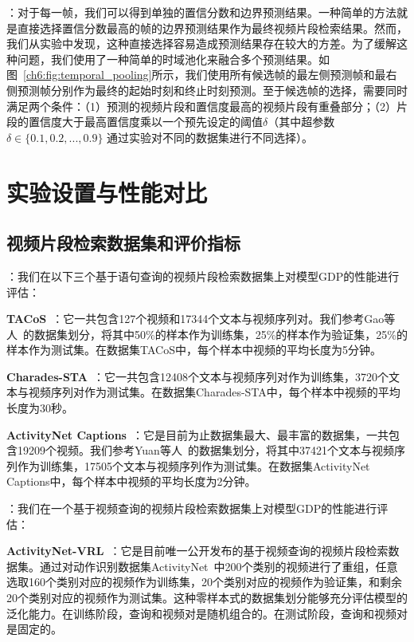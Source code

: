 \textbf{}：对于每一帧，我们可以得到单独的置信分数和边界预测结果。一种简单的方法就是直接选择置信分数最高的帧的边界预测结果作为最终视频片段检索结果。然而，我们从实验中发现，这种直接选择容易造成预测结果存在较大的方差。为了缓解这种问题，我们使用了一种简单的时域池化来融合多个预测结果。如图~\ref{ch6:fig:temporal_pooling}所示，我们使用所有候选帧的最左侧预测帧和最右侧预测帧分别作为最终的起始时刻和终止时刻预测。至于候选帧的选择，需要同时满足两个条件：（1）预测的视频片段和置信度最高的视频片段有重叠部分；（2）片段的置信度大于最高置信度乘以一个预先设定的阈值$\delta$（其中超参数$\delta \in \{0.1, 0.2, ..., 0.9 \}$ 通过实验对不同的数据集进行不同选择）。


\section{实验设置与性能对比}

\subsection{视频片段检索数据集和评价指标}

\textbf{}：我们在以下三个基于语句查询的视频片段检索数据集上对模型GDP的性能进行评估：

\textbf{TACoS}~\cite{regneri2013grounding}：它一共包含127个视频和17344个文本与视频序列对。我们参考Gao等人~\cite{gao2017tall}的数据集划分，将其中50\%的样本作为训练集，25\%的样本作为验证集，25\%的样本作为测试集。在数据集TACoS中，每个样本中视频的平均长度为5分钟。

\textbf{Charades-STA}~\cite{gao2017tall}：它一共包含12408个文本与视频序列对作为训练集，3720个文本与视频序列对作为测试集。在数据集Charades-STA中，每个样本中视频的平均长度为30秒。

\textbf{ActivityNet Captions}~\cite{krishna2017dense}：它是目前为止数据集最大、最丰富的数据集，一共包含19209个视频。我们参考Yuan等人~\cite{yuan2019find}的数据集划分，将其中37421个文本与视频序列作为训练集，17505个文本与视频序列作为测试集。在数据集ActivityNet Captions中，每个样本中视频的平均长度为2分钟。


\textbf{}：我们在一个基于视频查询的视频片段检索数据集上对模型GDP的性能进行评估：

\textbf{ActivityNet-VRL}~\cite{feng2018video}：它是目前唯一公开发布的基于视频查询的视频片段检索数据集。通过对动作识别数据集ActivityNet~\cite{caba2015activitynet}中200个类别的视频进行了重组，任意选取160个类别对应的视频作为训练集，20个类别对应的视频作为验证集，和剩余20个类别对应的视频作为测试集。这种零样本式的数据集划分能够充分评估模型的泛化能力。在训练阶段，查询和视频对是随机组合的。在测试阶段，查询和视频对是固定的。


